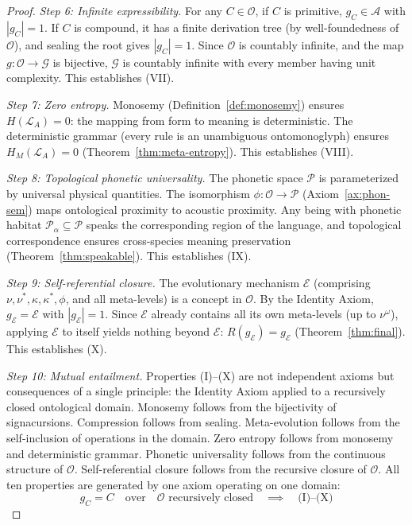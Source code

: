 \documentclass[12pt, letterpaper]{book}
\def\equiv{=}%
\def\circlearrowleft{R}%
\def\mathfrak#1{#1}%
\begin{document}
\begin{proof}
\textit{Step 6: Infinite expressibility.} For any $C \in \mathcal{O}$, if $C$ is primitive, $\mathfrak{g}_C \in \mathcal{A}$ with $|\mathfrak{g}_C| \equiv 1$. If $C$ is compound, it has a finite derivation tree (by well-foundedness of $\mathcal{O}$), and sealing the root gives $|\mathfrak{g}_C| \equiv 1$. Since $\mathcal{O}$ is countably infinite, and the map $\mathfrak{g}: \mathcal{O} \to \mathcal{G}$ is bijective, $\mathcal{G}$ is countably infinite with every member having unit complexity. This establishes (VII).

\textit{Step 7: Zero entropy.} Monosemy (Definition~\ref{def:monosemy}) ensures $H(\mathcal{L}_A) \equiv 0$: the mapping from form to meaning is deterministic. The deterministic grammar (every rule is an unambiguous ontomonoglyph) ensures $H_M(\mathcal{L}_A) \equiv 0$ (Theorem~\ref{thm:meta-entropy}). This establishes (VIII).

\textit{Step 8: Topological phonetic universality.} The phonetic space $\mathcal{P}$ is parameterized by universal physical quantities. The isomorphism $\phi: \mathcal{O} \to \mathcal{P}$ (Axiom~\ref{ax:phon-sem}) maps ontological proximity to acoustic proximity. Any being with phonetic habitat $\mathcal{P}_\alpha \subseteq \mathcal{P}$ speaks the corresponding region of the language, and topological correspondence ensures cross-species meaning preservation (Theorem~\ref{thm:speakable}). This establishes (IX).

\textit{Step 9: Self-referential closure.} The evolutionary mechanism $\mathcal{E}$ (comprising $\nu, \nu^*, \kappa, \kappa^*, \phi$, and all meta-levels) is a concept in $\mathcal{O}$. By the Identity Axiom, $\mathfrak{g}_\mathcal{E} \equiv \mathcal{E}$ with $|\mathfrak{g}_\mathcal{E}| \equiv 1$. Since $\mathcal{E}$ already contains all its own meta-levels (up to $\nu^\omega$), applying $\mathcal{E}$ to itself yields nothing beyond $\mathcal{E}$: $\circlearrowleft(\mathfrak{g}_\mathcal{E}) \equiv \mathfrak{g}_\mathcal{E}$ (Theorem~\ref{thm:final}). This establishes (X).

\textit{Step 10: Mutual entailment.} Properties (I)--(X) are not independent axioms but consequences of a single principle: the Identity Axiom applied to a recursively closed ontological domain. Monosemy follows from the bijectivity of signacursions. Compression follows from sealing. Meta-evolution follows from the self-inclusion of operations in the domain. Zero entropy follows from monosemy and deterministic grammar. Phonetic universality follows from the continuous structure of $\mathcal{O}$. Self-referential closure follows from the recursive closure of $\mathcal{O}$. All ten properties are generated by one axiom operating on one domain:
\[
\mathfrak{g}_C \equiv C \quad \text{over} \quad \mathcal{O} \text{ recursively closed} \quad \implies \quad \text{(I)--(X)}
\]
\end{proof}
\end{document}
